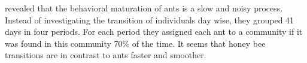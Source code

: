 \textcite{mersch2013tracking} revealed that the behavioral maturation of ants is a slow and noisy process. Instead of investigating the transition of individuals day wise, they grouped 41 days in four periods. For each period they assigned each ant to a community if it was found in this community 70\% of the time.
It seems that honey bee transitions are in contrast to ants faster and smoother.
